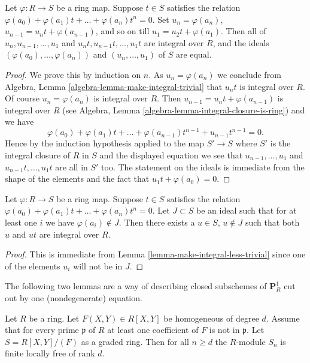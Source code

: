 \begin{lemma}
\label{lemma-make-integral-less-trivial}
Let $\varphi : R \to S$ be a ring map.
Suppose $t \in S$ satisfies the
relation $\varphi(a_0) + \varphi(a_1)t + \ldots + \varphi(a_n) t^n = 0$.
Set $u_n = \varphi(a_n)$, $u_{n-1} = u_n t + \varphi(a_{n-1})$,
and so on till $u_1 = u_2 t + \varphi(a_1)$.
Then all of $u_n, u_{n-1}, \ldots, u_1$ and
$u_nt, u_{n-1}t, \ldots, u_1t$ are integral over $R$,
and the ideals $(\varphi(a_0), \ldots, \varphi(a_n))$ and
$(u_n, \ldots, u_1)$ of $S$ are equal.
\end{lemma}

\begin{proof}
We prove this by induction on $n$. As $u_n = \varphi(a_n)$ we
conclude from
Algebra, Lemma \ref{algebra-lemma-make-integral-trivial}
that $u_nt$ is integral over $R$. Of course
$u_n = \varphi(a_n)$ is integral over $R$. Then
$u_{n - 1} = u_n t  + \varphi(a_{n - 1})$ is integral over $R$ (see
Algebra, Lemma \ref{algebra-lemma-integral-closure-is-ring})
and we have
$$
\varphi(a_0) + \varphi(a_1)t + \ldots + \varphi(a_{n - 1})t^{n - 1} +
u_{n - 1}t^{n - 1} = 0.
$$
Hence by the induction hypothesis applied to the map
$S' \to S$ where $S'$ is the integral closure of $R$ in $S$
and the displayed equation we see that
$u_{n-1}, \ldots, u_1$ and $u_{n-1}t, \ldots, u_1t$
are all in $S'$ too. The statement on the ideals is immediate from the
shape of the elements and the fact that $u_1t + \varphi(a_0) = 0$.
\end{proof}

\begin{lemma}
\label{lemma-make-integral-not-in-ideal}
Let $\varphi : R \to S$ be a ring map.
Suppose $t \in S$ satisfies the
relation $\varphi(a_0) + \varphi(a_1)t + \ldots + \varphi(a_n) t^n = 0$.
Let $J \subset S$ be an ideal such that for at
least one $i$ we have $\varphi(a_i) \not \in J$.
Then there exists a $u \in S$, $u \not\in J$ such
that both $u$ and $ut$ are integral over $R$.
\end{lemma}

\begin{proof}
This is immediate from Lemma \ref{lemma-make-integral-less-trivial}
since one of the elements $u_i$ will not be in $J$.
\end{proof}

\noindent
The following two lemmas are a way of describing closed
subschemes of $\mathbf{P}^1_R$ cut out by one (nondegenerate)
equation.

\begin{lemma}
\label{lemma-P1}
Let $R$ be a ring.
Let $F(X, Y) \in R[X, Y]$ be homogeneous of degree
$d$. Assume that for every prime $\mathfrak p$ of $R$
at least one coefficient of $F$ is not in $\mathfrak p$.
Let $S = R[X, Y]/(F)$ as a graded ring.
Then for all $n \geq d$ the $R$-module $S_n$
is finite locally free of rank $d$.
\end{lemma}


